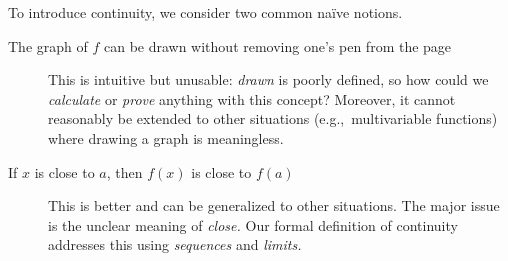 \goodbreak


To introduce continuity, we consider two common naïve notions.
\begin{description}
  \item[The graph of $f$ can be drawn without removing one's pen from the page] This is intuitive but unusable: \emph{drawn} is poorly defined, so how could we \emph{calculate} or \emph{prove} anything with this concept? Moreover, it cannot reasonably be extended to other situations (e.g.,\ multivariable functions) where drawing a graph is meaningless.
  \item[If $x$ is close to $a$, then $f(x)$ is close to $f(a)$] This is better and can be generalized to other situations. The major issue is the unclear meaning of \emph{close.} Our formal definition of continuity addresses this using \emph{sequences} and \emph{limits.}
\end{description}


